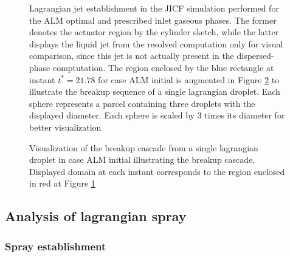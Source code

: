 \begin{figure}[h!]
	\centering	{}
	\caption[Lagrangian jet establishment in the JICF simulation performed for the ALM optimal and prescribed inlet gaseous phases]{Lagrangian jet establishment in the JICF simulation performed for the ALM optimal and prescribed inlet gaseous phases. The former denotes the actuator region by the cylinder sketch, while the latter displays the liquid jet from the resolved computation only for visual comparison, since this jet is not actually present in the dispersed-phase comptutation. The region enclosed by the blue rectangle at instant $t^* = 21.78$ for case ALM initial is augmented in Figure \ref{fig:JICF_LGS_breakup_cascade_in_ALM_figure} to illustrate the breakup sequence of a single lagrangian droplet. Each sphere represents a parcel containing three droplets with the displayed diameter. Each sphere is scaled by 3 times its diameter for better visualization}
	\label{fig:JICF_LGS_spray_establishment}
\end{figure}


\begin{figure}[h!]
	\centering	{}
	\caption[Visualization of the breakup cascade from a single lagrangian droplet in case ALM initial illustrating the breakup cascade]{Visualization of the breakup cascade from a single lagrangian droplet in case ALM initial illustrating the breakup cascade. Displayed domain at each instant corresponds to the region enclosed in red at Figure \ref{fig:JICF_LGS_spray_establishment}}
	\label{fig:JICF_LGS_breakup_cascade_in_ALM_figure}
\end{figure}

\subsection{Analysis of lagrangian spray}
\label{subsec:jicf_lgs_sed_gas_phase_influence_spray_analysis}

\subsubsection*{Spray establishment}


